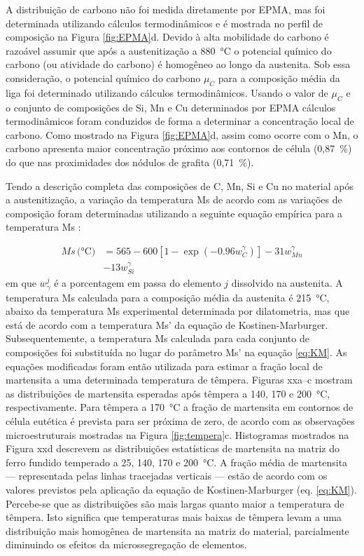 A distribuição de carbono não foi medida diretamente por EPMA, mas foi determinada utilizando cálculos termodinâmicos e é mostrada no perfil de composição na Figura \ref{fig:EPMA}d. Devido à alta mobilidade do carbono é razoável assumir que após a austenitização a 880~°C o potencial químico do carbono (ou atividade do carbono) é homogêneo ao longo da austenita. Sob essa consideração, o potencial químico do carbono $\mu_C$ para a composição média da liga foi determinado utilizando cálculos termodinâmicos. Usando o valor de $\mu_C$ e o conjunto de composições de Si, Mn e Cu determinados por EPMA cálculos termodinâmicos foram conduzidos de forma a determinar a concentração local de carbono. Como mostrado na Figura \ref{fig:EPMA}d, assim como ocorre com o Mn, o carbono apresenta maior concentração próximo aos contornos de célula (0,87~\%) do que nas proximidades dos nódulos de grafita (0,71~\%).

Tendo a descrição completa das composições de C, Mn, Si e Cu no material após a austenitização, a variação da temperatura Ms de acordo com as variações de composição foram determinadas utilizando a seguinte equação empírica para a temperatura Ms \cite{VanBohemen2012}:

\begin{align}
  Ms\,\text{(°C)} &= 565 - 600 \left[1 - \exp \left( -0.96 w_C^\gamma \right)\right] - 31 w_{Mn}^\gamma \nonumber\\
                & - 13 w_{Si}^\gamma
  \label{eq:MsVanBohemen}
\end{align}
%
em que $w^j_\gamma$ é a porcentagem em passa do elemento $j$ dissolvido na austenita. A temperatura Ms calculada para a composição média da austenita é 215~°C, abaixo da temperatura Ms experimental determinada por dilatometria, mas que está de acordo com a temperatura Ms' da equação de Kostinen-Marburger. Subsequentemente, a temperatura Ms calculada para cada conjunto de composições foi substituída no lugar do parâmetro Ms' na equação \ref{eq:KM}. As equações modificadas foram então utilizada para estimar a fração local de martensita a uma determinada temperatura de têmpera. Figuras xxa--c mostram as distribuições de martensita esperadas após têmpera a 140, 170 e 200~°C, respectivamente. Para têmpera a 170~°C a fração de martensita em contornos de célula eutética é prevista para ser próxima de zero, de acordo com as observações microestruturais mostradas na Figura \ref{fig:tempera}c. Histogramas mostrados na Figura xxd descrevem as distribuições estatísticas de martensita na matriz do ferro fundido temperado a 25, 140, 170 e 200~°C. A fração média de martensita --- representada pelas linhas tracejadas verticais --- estão de acordo com os valores previstos pela aplicação da equação de Kostinen-Marburger (eq. \ref{eq:KM}). Percebe-se que as distribuições são mais largas quanto maior a temperatura de têmpera. Isto significa que temperaturas mais baixas de têmpera levam a uma distribuição mais homogênea de martensita na matriz do material, parcialmente diminuindo os efeitos da microssegregação de elementos.